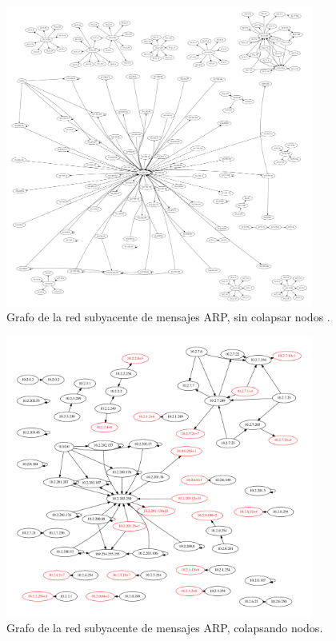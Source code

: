 \begin{figure}[ht]
    \centering
    \includegraphics[width=0.9\textwidth]{figuras/ciudad_10_grafoSinColapsar.pdf}
    \caption{Grafo de la red subyacente de mensajes ARP, sin colapsar nodos .}\label{ARPDC-sinColapsar}
\end{figure}

\begin{figure}[ht]
    \centering
    \includegraphics[width=0.9\textwidth]{figuras/ciudad_10_grafo.pdf}
    \caption{Grafo de la red subyacente de mensajes ARP, colapsando nodos.}\label{ARPDC}
\end{figure}

